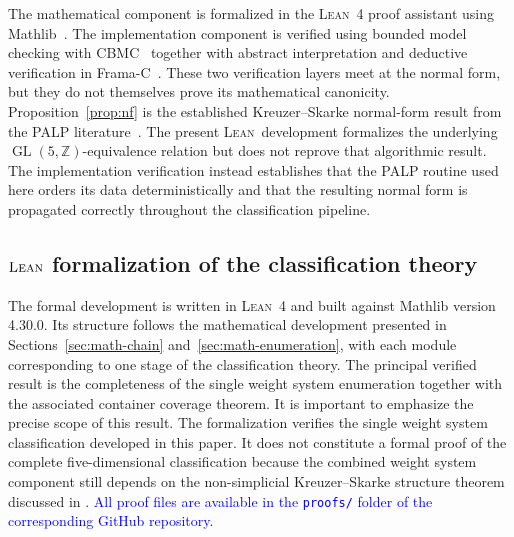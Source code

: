 \documentclass[appliedmath,article,submit,moreauthors]{Definitions/mdpi}
\newcommand{\Z}{\mathbb{Z}}
\newcommand{\GL}{\operatorname{GL}}
\newcommand{\Lean}{\textsc{Lean}}
\begin{document}
The mathematical component is formalized in the \Lean~4 proof assistant using
Mathlib~\cite{LeanMathlib}. The implementation component is verified using
bounded model checking with CBMC~\cite{CBMC} together with abstract
interpretation and deductive verification in Frama-C~\cite{FramaC}.
{\color{blue}These two verification layers meet at the normal form, but they do
not themselves prove its mathematical canonicity. Proposition~\ref{prop:nf} is
the established Kreuzer--Skarke normal-form result from the PALP
literature~\cite{PALP,GrinisKasprzyk2013}. The present \Lean\ development
formalizes the underlying \(\GL(5,\Z)\)-equivalence relation but does not
reprove that algorithmic result. The implementation verification instead
establishes that the PALP routine used here orders its data deterministically
and that the resulting normal form is propagated correctly throughout the
classification pipeline.}

\subsection{\texorpdfstring{\(\Lean\)}{Lean} formalization of the classification theory}
\label{sec:verification-lean}

The formal development is written in \Lean~4 and built against Mathlib version
4.30.0. Its structure follows the mathematical development presented in
Sections~\ref{sec:math-chain} and~\ref{sec:math-enumeration}, with each module corresponding to
one stage of the classification theory. The principal verified result is the
completeness of the single weight system enumeration together with the
associated container coverage theorem. It is important to emphasize the precise
scope of this result. The formalization verifies the single weight system
classification developed in this paper. It does not constitute a formal proof of
the complete five-dimensional classification because the combined weight system
component still depends on the non-simplicial Kreuzer--Skarke structure theorem
discussed in . \textcolor{blue}{All proof files are available
in the \nolinkurl{proofs/} folder of the corresponding GitHub repository.}
\end{document}
